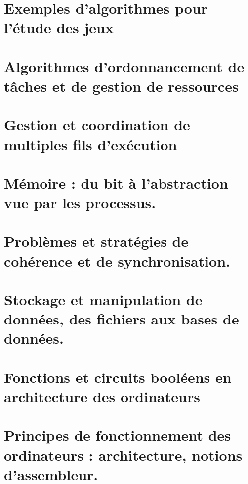 \chapter{Exemples d'algorithmes pour l'étude des jeux} \label{L16}


\chapter{Algorithmes d'ordonnancement de tâches et de gestion de ressources} \label{L17}


\chapter{Gestion et coordination de multiples fils d'exécution} \label{L18}


\chapter{Mémoire : du bit à l’abstraction vue par les processus.} \label{L19}

\chapter{Problèmes et stratégies de cohérence et de synchronisation.} \label{L20}


\chapter{Stockage et manipulation de données, des fichiers aux bases de données.} \label{L21}


\chapter{Fonctions et circuits booléens en architecture des ordinateurs} \label{L22}


\chapter{Principes de fonctionnement des ordinateurs : architecture, notions d’assembleur.} \label{L23}


%
 


